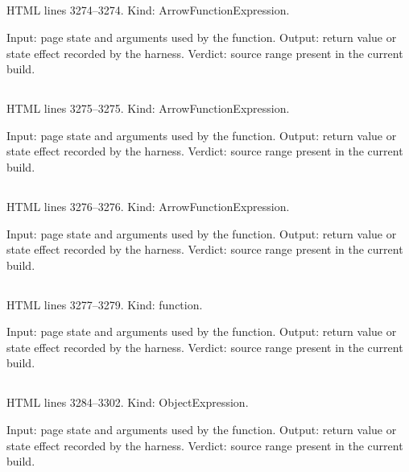\subsection*{\texttt{}}
\label{vf_105_txt}
HTML lines 3274--3274. Kind: ArrowFunctionExpression.

Input: page state and arguments used by the function.
Output: return value or state effect recorded by the harness.
Verdict: source range present in the current build.

\subsection*{\texttt{}}
\label{vf_106_argb}
HTML lines 3275--3275. Kind: ArrowFunctionExpression.

Input: page state and arguments used by the function.
Output: return value or state effect recorded by the harness.
Verdict: source range present in the current build.

\subsection*{\texttt{}}
\label{vf_107_bracketList}
HTML lines 3276--3276. Kind: ArrowFunctionExpression.

Input: page state and arguments used by the function.
Output: return value or state effect recorded by the harness.
Verdict: source range present in the current build.

\subsection*{\texttt{}}
\label{vf_108_ini}
HTML lines 3277--3279. Kind: function.

Input: page state and arguments used by the function.
Output: return value or state effect recorded by the harness.
Verdict: source range present in the current build.

\subsection*{\texttt{}}
\label{vf_109_FLAGS}
HTML lines 3284--3302. Kind: ObjectExpression.

Input: page state and arguments used by the function.
Output: return value or state effect recorded by the harness.
Verdict: source range present in the current build.

